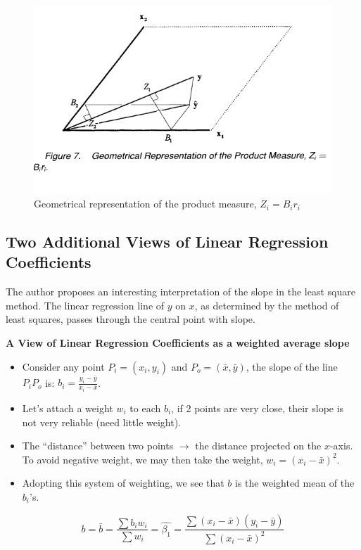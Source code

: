 \documentclass[
]{report}
\providecommand{\tightlist}{%
  \setlength{\itemsep}{0pt}\setlength{\parskip}{0pt}}
\begin{document}
\begin{figure}
    \centering
    \includegraphics[width= 250 pt]{Bring.PNG}
    \caption{Geometrical representation of the product measure, $Z_i = B_i r_i$}
\end{figure}

\hypertarget{two-additional-views-of-linear-regression-coefficients}{%
\subsection{Two Additional Views of Linear Regression Coefficients}\label{two-additional-views-of-linear-regression-coefficients}}

The author \citep{Cli} proposes an interesting interpretation of the slope in the least square method. The linear regression line of \(y\) on \(x\), as determined by the method of least squares, passes through the central point with slope.

\textbf{A View of Linear Regression Coefficients as a weighted average slope}

\begin{itemize}
\tightlist
\item
  Consider any point \(P_i=(x_i,y_i)\) and \(P_o=(\bar{x}, \bar{y})\), the slope of the line \(P_i P_o\) is: \(b_i=\frac{y_i -\bar{y}}{x_i-\bar{x}}\).
\item
  Let's attach a weight \(w_i\) to each \(b_i\), if 2 points are very close, their slope is not very reliable (need little weight).
\item
  The ``distance'' between two points \(\to\) the distance projected on the \(x\)-axis. To avoid negative weight, we may then take the weight, \(w_i=(x_i-\bar{x})^2\).
\item
  Adopting this system of weighting, we see that \(b\) is the weighted mean of the \(b_i\)'s.
\end{itemize}

\begin{equation}
    b=\bar{b}=\frac{\sum b_i w_i}{\sum w_i} = \hat{\beta_1} =        \frac{\sum(x_i -\bar{x})(y_i -\bar{y})}{\sum(x_i -\bar{x})^2}
\end{equation}
\end{document}
